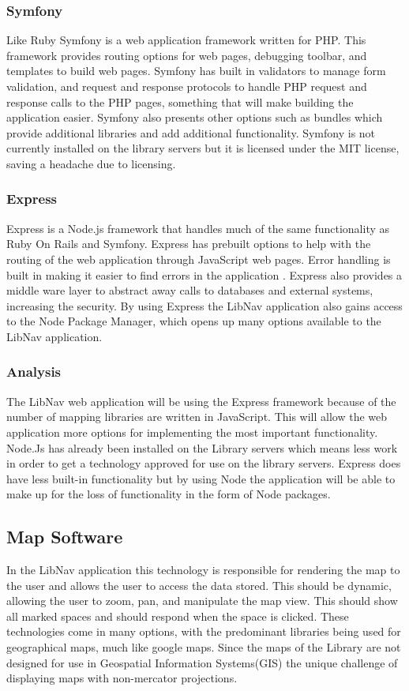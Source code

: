 \documentclass[letterpaper,10pt,titlepage, onecolumn, compsoc]{IEEEtran}
\begin{document}
\subsubsection{Symfony}
Like Ruby Symfony is a web application framework written for PHP. This framework provides routing options for web pages, debugging toolbar, and templates to build web pages. Symfony has built in validators to manage form validation, and request and response protocols to handle PHP request and response calls to the PHP pages, something that will make building the application easier. Symfony also presents other options such as bundles which provide additional libraries and add additional functionality. Symfony is not currently installed on the library servers but it is licensed under the MIT license, saving a headache due to licensing.\cite{Symfony}

\subsubsection{Express}
Express is a Node.js framework that handles much of the same functionality as Ruby On Rails and Symfony. Express has prebuilt options to help with the routing of the web application through JavaScript web pages. Error handling is built in making it easier to find errors in the application . Express also provides a middle ware layer to abstract away calls to databases and external systems, increasing the security. By using Express the LibNav application also gains access to the Node Package Manager, which opens up many options available to the LibNav application.\cite{express}

\subsubsection{Analysis}
The LibNav web application will be using the Express framework because of the number of mapping libraries are written in JavaScript. This will allow the web application more options for implementing the most important functionality. Node.Js has already been installed on the Library servers which means less work in order to get a technology approved for use on the library servers.  Express does have less built-in functionality but by using Node the application will be able to make up for the loss of functionality in the form of Node packages. 

\subsection{Map Software}
In the LibNav application this technology is responsible for rendering the map to the user and allows the user to access the data stored. This should be dynamic, allowing the user to zoom, pan, and manipulate the map view. This should show all marked spaces and should respond when the space is clicked. These technologies come in many options, with the predominant libraries being used for geographical maps, much like google maps. Since the maps of the Library are not designed for use in Geospatial Information Systems(GIS) the unique challenge of displaying maps with non-mercator projections.
\end{document}
